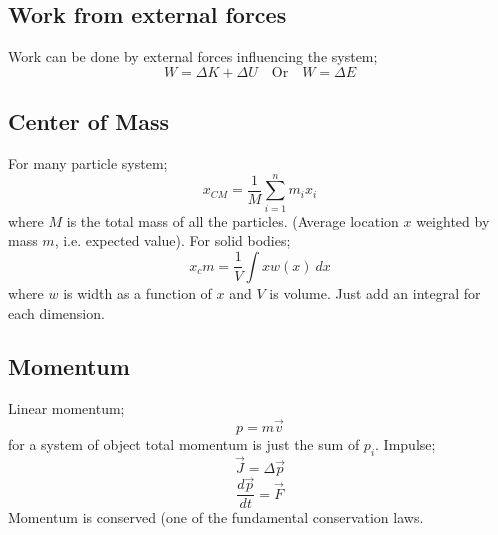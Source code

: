\documentclass{article}
\begin{document}
\begin{multicols}{2}
\subsection*{Work from external forces}
Work can be done by external forces influencing the system;
\[
	W = \Delta K + \Delta U \quad \text{Or} \quad W = \Delta E
\]

\subsection*{Center of Mass}
For many particle system;
\[
	x_{CM} = \frac{1}{M}\sum_{i=1}^n m_i x_i
\]
where $M$ is the total mass of all the particles. (Average location $x$ weighted by mass $m$, i.e. expected value).
For solid bodies;
\[
	x_cm = \frac{1}{V} \int x w(x) \ dx
\]
where $w$ is width as a function of $x$ and $V$ is volume. Just add an integral for each dimension.

\subsection*{Momentum}
Linear momentum;
\[
	p = m \vec{v}
\]
for a system of object total momentum is just the sum of $p_i$.
Impulse;
\[
	\vec{J} = \Delta \vec{p}
\]
\[
	\frac{d\vec{p}}{dt} = \vec{F}
\]
Momentum is conserved (one of the fundamental conservation laws.

\end{multicols}
\end{document}
